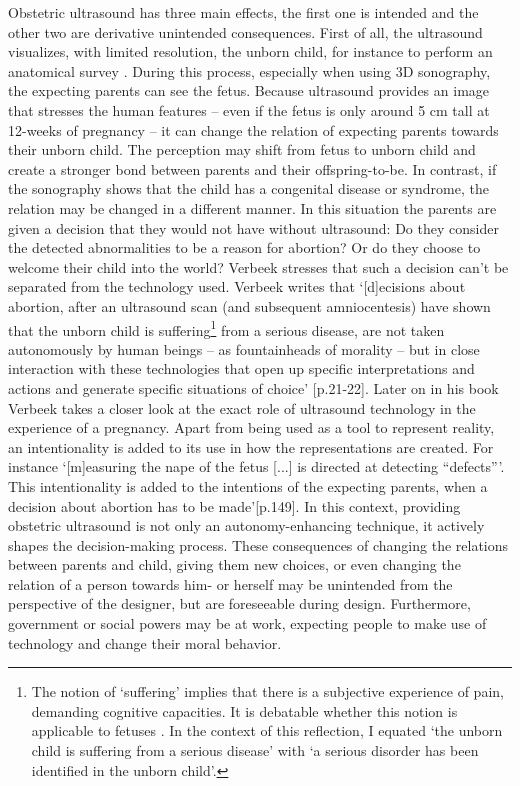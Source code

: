 Obstetric ultrasound has three main effects, the first one is intended and the other two are derivative unintended consequences. 
First of all, the ultrasound visualizes, with limited resolution, the unborn child, for instance to perform an anatomical survey \cite{Platt_2013,Bahtiyar_2015}. 
During this process, especially when using 3D sonography, the expecting parents can see the fetus. Because ultrasound provides an image that stresses the human features – even if the fetus is only around 5 cm tall at 12-weeks of pregnancy – it can change the relation of expecting parents towards their unborn child. 
The perception may shift from fetus to unborn child and create a stronger bond between parents and their offspring-to-be. 
In contrast, if the sonography shows that the child has a congenital disease or syndrome, the relation may be changed in a different manner.
In this situation the parents are given a decision that they would not have without ultrasound: Do they consider the detected abnormalities to be a reason for abortion? 
Or do they choose to welcome their child into the world? Verbeek stresses that such a decision can’t be separated from the technology used. 
Verbeek writes that ‘[d]ecisions about abortion, after an ultrasound scan (and subsequent amniocentesis) have shown that the unborn child is suffering\footnote{The notion of ‘suffering’ implies that there is a subjective experience of pain, demanding cognitive capacities. It is debatable whether this notion is applicable to fetuses \cite{Derbyshire_2006}. In the context of this reflection, I equated ‘the unborn child is suffering from a serious disease’ with ‘a serious disorder has been identified in the unborn child’.} from a serious disease, are not taken autonomously by human beings – as fountainheads of morality – but in close interaction with these technologies that open up specific interpretations and actions and generate specific situations of choice’ \cite{Verbeek_2011}[p.21-22]. 
Later on in his book Verbeek takes a closer look at the exact role of ultrasound technology in the experience of a pregnancy. 
Apart from being used as a tool to represent reality, an intentionality is added to its use in how the representations are created. 
For instance ‘[m]easuring the nape of the fetus [...] is directed at detecting “defects”’.
This intentionality is added to the intentions of the expecting parents, when a decision about abortion has to be made’[p.149]. 
In this context, providing obstetric ultrasound is not only an autonomy-enhancing technique, it actively shapes the decision-making process. 
These consequences of changing the relations between parents and child, giving them new choices, or even changing the relation of a person towards him- or herself may be unintended from the perspective of the designer, but are foreseeable during design. 
Furthermore, government or social powers may be at work, expecting people to make use of technology and change their moral behavior.

